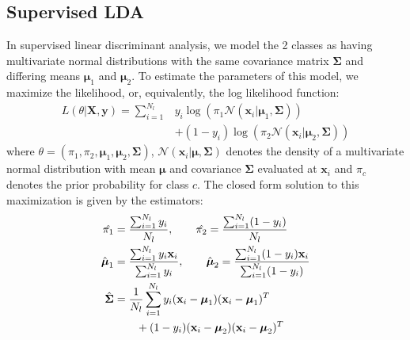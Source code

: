 \subsection{Supervised LDA}
In supervised linear discriminant analysis, we model the 2 classes as having multivariate normal distributions with the same covariance matrix $\boldsymbol{\Sigma}$ and differing means $\boldsymbol{\mu}_1$ and $\boldsymbol{\mu}_2$. To estimate the parameters of this model, we maximize the likelihood, or, equivalently, the log likelihood function:
\begin{align}
\label{eq:lda}
L(\theta|\mathbf{X},\mathbf{y})= \sum_{i=1}^{N_l} & y_i \log(\pi_1 \mathcal{N}(\mathbf{x}_i|\boldsymbol{\mu}_1,\mathbf{\Sigma})) \nonumber \\
& +(1-y_i) \log(\pi_2 \mathcal{N}(\mathbf{x}_i|\boldsymbol{\mu}_2,\mathbf{\Sigma}))
\end{align}
where $\theta=\left( \pi_1,\pi_2, \boldsymbol{\mu}_1,\boldsymbol{\mu}_2,\mathbf{\Sigma} \right)$, $\mathcal{N}(\mathbf{x}_i|\boldsymbol{\mu},\mathbf{\Sigma})$ denotes the density of a multivariate normal distribution with mean $\boldsymbol{\mu}$ and covariance $\mathbf{\Sigma}$ evaluated at $\mathbf{x}_i$ and $\pi_c$ denotes the prior probability for class $c$. The closed form solution to this maximization is given by the estimators:
\begin{align}
\label{eq:ldasolution}
\hat{\pi_1} &= \frac{\sum_{i=1}^{N_l} y_i}{N_l}, \hspace{20px} \hat{\pi_2} = \frac{\sum_{i=1}^{N_l} (1-y_i)}{N_l}  \nonumber \\
\hat{\boldsymbol{\mu}}_1 &= \frac{\sum_{i=1}^{N_l} y_i \mathbf{x}_i}{\sum_{i=1}^{N_l} y_i}, \hspace{20px} \hat{\boldsymbol{\mu}}_2 = \frac{\sum_{i=1}^{N_l} (1-y_i) \mathbf{x}_i}{\sum_{i=1}^{N_l} (1-y_i)}  \nonumber  \\
\hat{\mathbf{\Sigma}} &= \frac{1}{N_l} \sum_{i=1}^{N_l} y_i (\mathbf{x}_i-\boldsymbol{\mu}_1) (\mathbf{x}_i-\boldsymbol{\mu}_1)^T  \nonumber \\
& \hspace{20px} + (1-y_i) (\mathbf{x}_i-\boldsymbol{\mu}_2) (\mathbf{x}_i-\boldsymbol{\mu}_2)^T 
\end{align}
